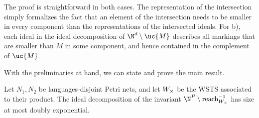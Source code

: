 \documentclass[../../diss.tex]{subfiles}
\begin{document}
The proof is straightforward in both cases.
The representation of the intersection simply formalizes the fact that an element of the intersection needs to be smaller in every component than the representations of the intersected ideals.
For b), each ideal in the ideal decomposition of $\N^d \setminus \uc{M}$ describes all markings that are smaller than $M$ in some component, and hence contained in the complement of $\uc{M}$.

With the preliminaries at hand, we can state and prove the main result.

\begin{proposition}%
\label{Proposition:PNSeparabilityUpperBound}%
    Let $N_1,N_2$ be languages-disjoint Petri nets, and let $W_{\times}$ be the WSTS associated to their product.
    The ideal decomposition of the invariant $\N^P \setminus \reachrev{\wsts_{\times}}$ has size at most doubly exponential.
\end{proposition}
\end{document}
